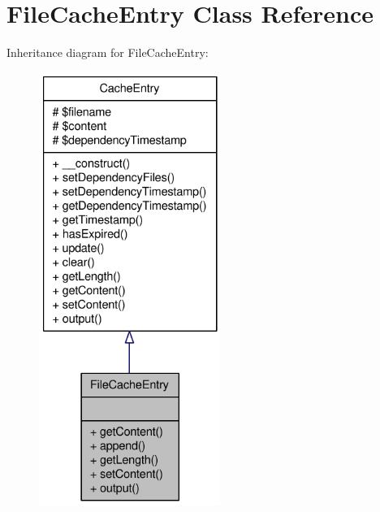 \hypertarget{classFileCacheEntry}{
\section{FileCacheEntry Class Reference}
\label{classFileCacheEntry}
}


Inheritance diagram for FileCacheEntry:\nopagebreak
\begin{figure}[H]
\begin{center}
\leavevmode
\includegraphics[height=400pt]{classFileCacheEntry__inherit__graph}
\end{center}
\end{figure}


